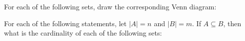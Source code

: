 \documentclass[]{exam}
\def\bonusoff{\renewcommand\partlabel{(\thepartno)}}
\begin{document}
\begin{questions}

    \newpage

    \question For each of the following sets, draw the corresponding Venn
      diagram:


    \newpage

    \question For each of the following statements, let $|A| = n$ and $|B| = m$.
      If $A \subseteq B$, then what is the cardinality of each of the following
      sets:

\end{questions}
\end{document}
